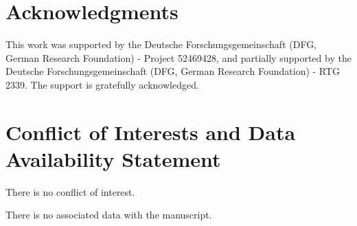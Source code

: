 \documentclass[10pt,reqno]{amsart}
\theoremstyle{remark}
\numberwithin{equation}{section}
\begin{document}
\bigskip
\noindent 
\section*{Acknowledgments} 
This work was supported by the Deutsche Forschungsgemeinschaft (DFG, German Research Foundation) - Project 52469428, and partially supported by the Deutsche Forschungsgemeinschaft (DFG, German Research Foundation) - RTG 2339. The support is gratefully acknowledged.


\section*{Conflict of Interests and Data Availability Statement}

There is no conflict of interest.

There is no associated data with the manuscript.


\footnotesize



\end{document}
